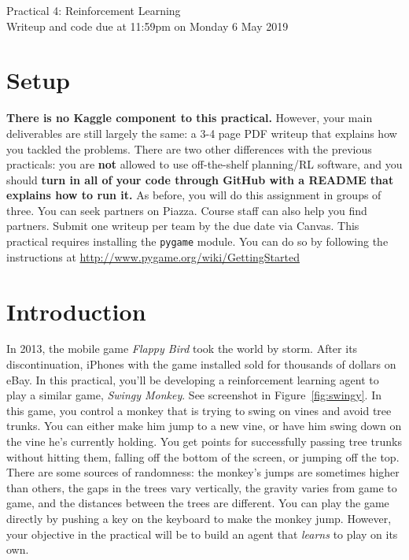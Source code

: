 \documentclass[12pt]{article}
\begin{document}
\begin{center}
{\Large Practical 4: Reinforcement Learning}\\
Writeup and code due at 11:59pm on Monday 6 May 2019\\
\end{center}

\section*{Setup}

{\bf There is no Kaggle component to this practical.}  However, your main deliverables are still largely the same: a 3-4 page PDF writeup that explains how you tackled the problems.  There are two other differences with the previous practicals: you are \textbf{not} allowed to use off-the-shelf planning/RL software, and you should {\bf turn in all of your code through GitHub with a README that explains how to run it.} As before, you will do this assignment in groups of three.  You can seek partners on Piazza.  Course staff can also help you find partners. Submit one writeup per team by the due date via Canvas.  This practical requires installing the \verb|pygame| module. You can do so by following the instructions at \url{http://www.pygame.org/wiki/GettingStarted}


\section*{Introduction}

In 2013, the mobile game \emph{Flappy Bird} took the world by storm.  After its discontinuation, iPhones with the game installed sold for thousands of dollars on eBay.  In this practical, you'll be developing a reinforcement learning agent to play a similar game, \emph{Swingy Monkey}.  See screenshot in Figure~\ref{fig:swingy}.  In this game, you control a monkey that is trying to swing on vines and avoid tree trunks.  You can either make him jump to a new vine, or have him swing down on the vine he's currently holding.  You get points for successfully passing tree trunks without hitting them, falling off the bottom of the screen, or jumping off the top.  There are some sources of randomness: the monkey's jumps are sometimes higher than others, the gaps in the trees vary vertically, the gravity varies from game to game, and the distances between the trees are different.  You can play the game directly by pushing a key on the keyboard to make the monkey jump.  However, your objective in the practical will be to build an agent that \emph{learns} to play on its own.
\end{document}
